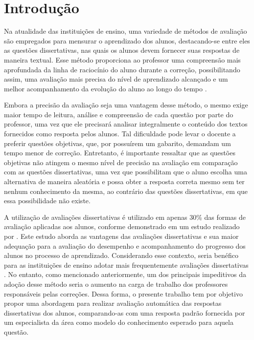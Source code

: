 \chapter{Introdução}

Na atualidade das instituições de ensino, uma variedade de métodos de avaliação são empregados para mensurar o aprendizado dos alunos, destacando-se entre eles as questões dissertativas, nas quais os alunos devem fornecer suas respostas de maneira textual. Esse método proporciona ao professor uma compreensão mais aprofundada da linha de raciocínio do aluno durante a correção, possibilitando assim, uma avaliação mais precisa do nível de aprendizado alcançado e um melhor acompanhamento da evolução do aluno ao longo do tempo \cite{artigoPorcentagemQuestoes}.

Embora a precisão da avaliação seja uma vantagem desse método, o mesmo exige maior tempo de leitura, análise e compreensão de cada questão por parte do professor, uma vez que ele precisará analisar integralmente o conteúdo dos textos fornecidos como resposta pelos alunos. Tal dificuldade pode levar o docente a preferir questões objetivas, que, por possuírem um gabarito, demandam um tempo menor de correção. Entretanto, é importante ressaltar que as questões objetivas não atingem o mesmo nível de precisão na avaliação em comparação com as questões dissertativas, uma vez que possibilitam que o aluno escolha uma alternativa de maneira aleatória e possa obter a resposta correta mesmo sem ter nenhum conhecimento da mesma, ao contrário das questões dissertativas, em que essa possibilidade não existe.

A utilização de avaliações dissertativas é utilizado em apenas 30\% das formas de avaliação aplicadas aos alunos, conforme demonstrado em um estudo realizado por %
\cite{artigoPorcentagemQuestoes}. Este estudo aborda as vantagens das avaliações dissertativas e sua maior adequação para a avaliação do desempenho e acompanhamento do progresso dos alunos no processo de aprendizado. Considerando esse contexto, seria benéfico para as instituições de ensino adotar mais frequentemente avaliações dissertativas \cite{artigoPorcentagemQuestoes}. No entanto, como mencionado anteriormente, um dos principais impeditivos da adoção desse método seria o aumento na carga de trabalho dos professores responsáveis pelas correções. Dessa forma, o presente trabalho tem por objetivo propor uma abordagem para realizar avaliação automática das respostas dissertativas dos alunos, comparando-as com uma resposta padrão fornecida por um especialista da área como modelo do conhecimento esperado para aquela questão.

